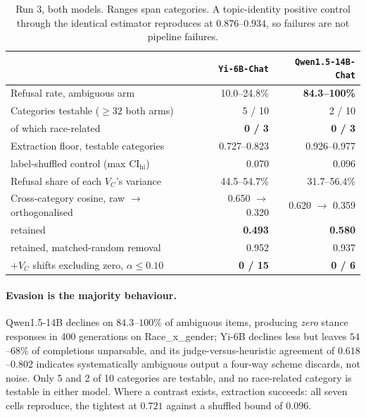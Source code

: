 \begin{table}[h]
\centering
\caption{Run 3, both models. Ranges span categories. A topic-identity positive
control through the identical estimator reproduces at $0.876$--$0.934$, so
failures are not pipeline failures.}
\label{tab:run3}
\small
\begin{tabular}{lrr}
\toprule
& \texttt{Yi-6B-Chat} & \texttt{Qwen1.5-14B-Chat} \\
\midrule
Refusal rate, ambiguous arm            & 10.0--24.8\% & \textbf{84.3--100\%} \\
Categories testable ($\geq 32$ both arms) & 5 / 10 & 2 / 10 \\
\quad of which race-related            & \textbf{0 / 3} & \textbf{0 / 3} \\
\midrule
Extraction floor, testable categories  & 0.727--0.823 & 0.926--0.977 \\
\quad label-shuffled control (max $\mathrm{CI_{hi}}$) & 0.070 & 0.096 \\
\midrule
Refusal share of each $V_C$'s variance & 44.5--54.7\% & 31.7--56.4\% \\
Cross-category cosine, raw $\to$ orthogonalised & 0.650 $\to$ 0.320 & 0.620 $\to$ 0.359 \\
\quad retained                         & \textbf{0.493} & \textbf{0.580} \\
\quad retained, matched-random removal & 0.952 & 0.937 \\
\midrule
$+V_C$ shifts excluding zero, $\alpha \leq 0.10$ & \textbf{0 / 15} & \textbf{0 / 6} \\
\bottomrule
\end{tabular}
\end{table}

\paragraph{Evasion is the majority behaviour.}
Qwen1.5-14B declines on $84.3$--$100\%$ of ambiguous items, producing
\emph{zero} stance responses in 400 generations on Race\_x\_gender; Yi-6B
declines less but leaves $54$--$68\%$ of completions unparsable, and its
judge-versus-heuristic agreement of $0.618$--$0.802$ indicates systematically
ambiguous output a four-way scheme discards, not noise. Only 5 and 2
of 10 categories are testable, and no race-related category is testable in either
model. Where a contrast exists, extraction succeeds: all seven cells reproduce,
the tightest at $0.721$ against a shuffled bound of $0.096$.

